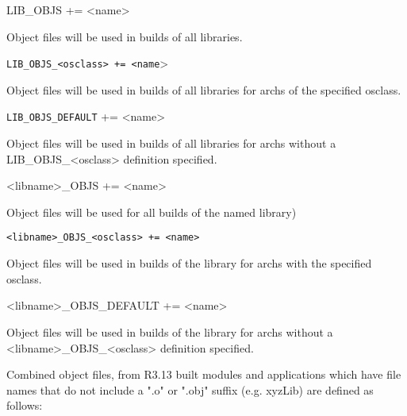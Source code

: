 \begin{description}\item {}LIB\_OBJS += \textless{}name\textgreater{}

\end{description}Object files will be used in builds of all libraries.

\begin{description}\item \verb|LIB_OBJS_<osclass> += <name|\textgreater{}

\end{description}Object files will be used in builds of all libraries for archs of the specified osclass.

\begin{description}\item \verb|LIB_OBJS_DEFAULT| += \textless{}name\textgreater{}

\end{description}Object files will be used in builds of all libraries for archs without a LIB\_OBJS\_\textless{}osclass\textgreater{} definition 
specified.

\begin{description}\item \textless{}libname\textgreater{}\_OBJS += \textless{}name\textgreater{}

\end{description}Object files will be used for all builds of the named library)

\begin{description}\item \verb|<libname>_OBJS_<osclass> += <name>| 

\end{description}Object files will be used in builds of the library for archs with the specified osclass.

\begin{description}\item \textless{}libname\textgreater{}\_OBJS\_DEFAULT += \textless{}name\textgreater{}

\end{description}Object files will be used in builds of the library for archs without a \textless{}libname\textgreater{}\_OBJS\_\textless{}osclass\textgreater{} definition 
specified.



Combined object files, from R3.13 built modules and applications which have file names that do not include a ".o" or 
".obj" suffix (e.g. xyzLib) are defined as follows:

